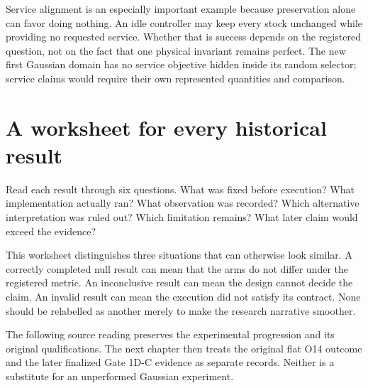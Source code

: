 Service alignment is an especially important example because preservation
alone can favor doing nothing. An idle controller may keep every stock
unchanged while providing no requested service. Whether that is success
depends on the registered question, not on the fact that one physical
invariant remains perfect. The new first Gaussian domain has no service
objective hidden inside its random selector; service claims would require
their own represented quantities and comparison.

\section{A worksheet for every historical result}
Read each result through six questions. What was fixed before execution?
What implementation actually ran? What observation was recorded? Which
alternative interpretation was ruled out? Which limitation remains? What
later claim would exceed the evidence?

This worksheet distinguishes three situations that can otherwise look
similar. A correctly completed null result can mean that the arms do not
differ under the registered metric. An inconclusive result can mean the
design cannot decide the claim. An invalid result can mean the execution
did not satisfy its contract. None should be relabelled as another merely
to make the research narrative smoother.

The following source reading preserves the experimental progression and
its original qualifications. The next chapter then treats the original
flat O14 outcome and the later finalized Gate 1D-C evidence as separate
records. Neither is a substitute for an unperformed Gaussian experiment.
